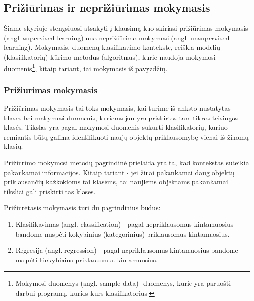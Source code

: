 \subsection{Prižiūrimas ir neprižiūrimas mokymasis}

Šiame skyriuje stengsiuosi atsakyti į klausimą kuo skiriasi prižiūrimas mokymasis
(angl. supervised learning) nuo neprižiūrimo mokymosi (angl. unsupervised
learning). Mokymasis, duomenų klasifikavimo kontekste, reiškia modelių
(klasifikatorių) kūrimo metodus (algoritmus), kurie naudoja
mokymosi duomenis\footnote{Mokymosi duomenys (angl. sample data)- duomenys,
kurie yra paruošti darbui programų, kurios kurs klasifikatorius.}, kitaip
tariant, tai mokymasis iš pavyzdžių.

\subsubsection{Prižiūrimas mokymasis}

Prižiūrimas mokymasis tai toks mokymasis, kai turime iš anksto nustatytas
klases bei mokymosi duomenis, kuriems jau yra priskirtos tam tikros
teisingos klasės. Tikslas yra pagal mokymosi duomenis sukurti klasifikatorių,
kuriuo remiantis būtų galima identifikuoti naujų objektų priklausomybę vienai iš
žinomų klasių.\cite{markhall99}


\begin{comment}
Prižiūrimojo mokymosi esmė: turime aibę duomenų, kurios objektai yra vadinami
įėjimo duomenimis (angl. Input) arba nepriklausomais kintamaisiais (angl.
Independent variables), jų reikšmės yra išmatuotos arba nustatytos. Darome prielaidą, 
kad nepriklausomi kintamieji turi įtakos vienam ar daugiau rezultato kintamųjų 
(angl. Output) arba priklausomų kintamųjų (angl. Dependent variables). Paėmus dar vieną 
duomenų objektą (angl. Tuple), tikslas yra pagal nepriklausomus kintamuosius nuspėti priklausomus kintamuosius.
\end{comment}

Prižiūrimo mokymosi metodų pagrindinė prielaida yra ta, kad kontekstas suteikia
pakankamai informacijos. Kitaip tariant - jei žinai pakankamai daug objektų priklausančių kažkokioms tai 
klasėms, tai naujiems objektams pakankamai tiksliai gali priskirti tas klases.

Prižiūrėtasis mokymasis turi du pagrindinius būdus:
\begin{enumerate}
  \item Klasifikavimas (angl. classification) - pagal nepriklausomus
  kintamuosius bandome nuspėti kokybinius (kategorinius) priklausomus kintamuosius. 
  \item Regresija (angl. regression) - pagal nepriklausomus kintamuosius bandome
  nuspėti kiekybinius priklausomus kintamuosius.
\end{enumerate}

